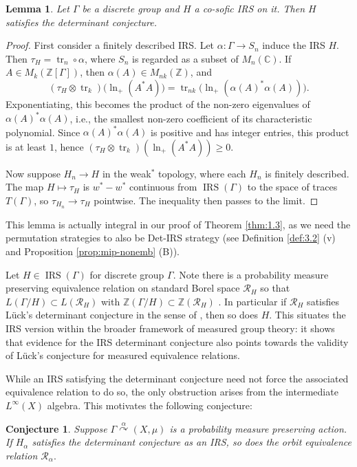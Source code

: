 \documentclass[pdflatex,sn-mathphys-num]{sn-jnl}%
\newtheorem{lemma}[theorem]{Lemma}
\newtheorem{conjecture}[theorem]{Conjecture}
\DeclareMathOperator{\tr}{tr}
\newcommand{\IRS}{\operatorname{IRS}}
\begin{document}
\begin{lemma}\label{lem:2.13}
    Let $\Gamma$ be a discrete group and $H$ a co-sofic IRS on it.  
    Then $H$ satisfies the determinant conjecture.
\end{lemma}

\begin{proof}
    First consider a finitely described IRS.  
    Let $\alpha \colon \Gamma \to S_n$ induce the IRS $H$.  
    Then $\tau_H = \tr_n \circ \alpha$, where $S_n$ is regarded as a subset of $M_n(\mathbb{C})$.  
    If $A \in M_k(\mathbb{Z}[\Gamma])$, then $\alpha(A) \in M_{nk}(\mathbb{Z})$, and
    \[
        (\tau_H \otimes \tr_k)\big(\ln_+(A^*A)\big)
        = \tr_{nk}\big(\ln_+(\alpha(A)^*\alpha(A))\big).
    \]
    Exponentiating, this becomes the product of the non-zero eigenvalues of $\alpha(A)^*\alpha(A)$, i.e., the smallest non-zero coefficient of its characteristic polynomial.  
    Since $\alpha(A)^*\alpha(A)$ is positive and has integer entries, this product is at least $1$, hence $(\tau_H \otimes \tr_k)(\ln_+(A^*A)) \geq 0$.

    Now suppose $H_n \to H$ in the weak$^*$ topology, where each $H_n$ is finitely described.  
    The map $H \mapsto \tau_H$ is $w^*\!-\!w^*$ continuous from $\IRS(\Gamma)$ to the space of traces $T(\Gamma)$, so $\tau_{H_n} \to \tau_H$ pointwise.  
    The inequality then passes to the limit.
\end{proof}

This lemma is actually integral in our proof of Theorem \ref{thm:1.3}, as we need the permutation strategies to also be Det-IRS strategy (see Definition \ref{def:3.2} (v) and Proposition \ref{prop:mip-nonemb} (B)).

Let $H\in \IRS(\Gamma)$ for discrete group $\Gamma$. Note there is a probability measure preserving equivalence relation on standard Borel space $\mathcal{R}_H$ so that $L(\Gamma/H)\subset L(\mathcal{R}_H)$ with $\mathbb{Z}(\Gamma/H)\subset \mathbb{Z}(\mathcal{R}_H)$ \cite[proposition 2.11]{manzoor_there_2025}. In particular if $\mathcal{R}_H$ satisfies L\"uck's determinant conjecture in the sense of \cite{lueck_l2-torsion_2010}, then so does $H$. This situates the IRS version within the broader framework of measured group theory: it shows that evidence for the IRS determinant conjecture also points towards the validity of L\"uck’s conjecture for measured equivalence relations.

While an IRS satisfying the determinant conjecture need not force the associated equivalence relation to do so, the only obstruction arises from the intermediate $L^\infty(X)$ algebra. This motivates the following conjecture:
\begin{conjecture}\label{conj:2.14}
    Suppose $\Gamma \overset{\alpha}{\curvearrowright} (X,\mu)$ is a probability measure preserving action. If $H_\alpha$ satisfies the determinant conjecture as an IRS, so does the orbit equivalence relation $\mathcal{R}_\alpha.$
\end{conjecture}
\end{document}
